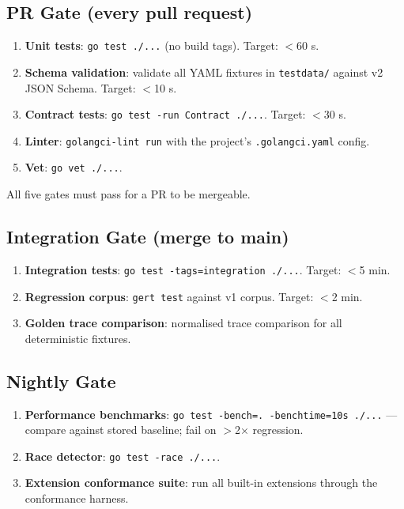 \subsection{PR Gate (every pull request)}

\begin{enumerate}[label=\arabic*.]
  \item \textbf{Unit tests}: \texttt{go test ./...} (no build tags). Target: $<$60 s.
  \item \textbf{Schema validation}: validate all YAML fixtures in \texttt{testdata/} against v2 JSON Schema. Target: $<$10 s.
  \item \textbf{Contract tests}: \texttt{go test -run Contract ./...}. Target: $<$30 s.
  \item \textbf{Linter}: \texttt{golangci-lint run} with the project's \texttt{.golangci.yaml} config.
  \item \textbf{Vet}: \texttt{go vet ./...}.
\end{enumerate}

All five gates must pass for a PR to be mergeable.

\subsection{Integration Gate (merge to main)}

\begin{enumerate}[label=\arabic*.]
  \item \textbf{Integration tests}: \texttt{go test -tags=integration ./...}. Target: $<$5 min.
  \item \textbf{Regression corpus}: \texttt{gert test} against v1 corpus. Target: $<$2 min.
  \item \textbf{Golden trace comparison}: normalised trace comparison for all deterministic fixtures.
\end{enumerate}

\subsection{Nightly Gate}

\begin{enumerate}[label=\arabic*.]
  \item \textbf{Performance benchmarks}: \texttt{go test -bench=. -benchtime=10s ./...} — compare against stored baseline; fail on $>$2$\times$ regression.
  \item \textbf{Race detector}: \texttt{go test -race ./...}.
  \item \textbf{Extension conformance suite}: run all built-in extensions through the conformance harness.
\end{enumerate}
